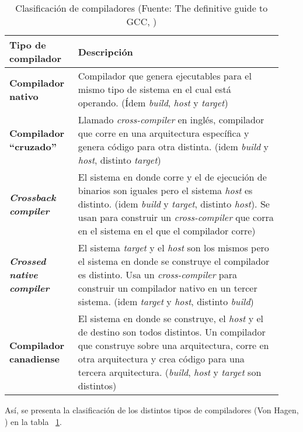     \begin{table}[t]
        \centering
            \caption{Clasificación de compiladores (Fuente: The definitive guide to GCC, \cite{von_hagen_definitive_2006}) }
            \label{tab:TiposCompiladores}
            \begin{tabular}{ | p{0.23\linewidth} | p{0.7\linewidth} | }
                \hline
                \textbf{Tipo de compilador}  & \textbf{Descripción}  \\ \hline
                \textbf{Compilador nativo}  & Compilador que genera  ejecutables para el mismo tipo de sistema en  el cual está operando. (Ídem \emph{build}, \emph{host} y \emph{target})  \\ \hline
                \raggedright \textbf{Compilador “cruzado”}  & Llamado \emph{cross-compiler} en inglés, compilador que corre en una arquitectura específica y genera código para otra distinta. (idem \emph{build} y \emph{host}, distinto \emph{target})   \\ \hline
                \textbf{\emph{Crossback compiler}}    & El sistema en donde corre y el de ejecución de binarios son iguales pero el sistema \emph{host} es distinto. (idem \emph{build} y \emph{target}, distinto \emph{host}).  Se usan para construir un \emph{cross-compiler} que corra en el sistema en el que el compilador corre)  \\ \hline
                \textbf{\emph{Crossed native compiler}}    & El sistema \emph{target} y el \emph{host} son los mismos pero el sistema en donde se construye el compilador es distinto. Usa un \emph{cross-compiler} para construir un compilador nativo en un tercer sistema. (idem \emph{target} y \emph{host}, distinto \emph{build})  \\ \hline
                \raggedright \textbf{Compilador canadiense}    &   El sistema en donde se construye, el \emph{host} y el de destino son todos distintos. Un compilador que construye sobre una arquitectura, corre en otra arquitectura y crea código para una tercera arquitectura. (\emph{build}, \emph{host} y \emph{target} son distintos)   \\ \hline
            \end{tabular}
        \par
    \end{table}

    Así, se presenta la clasificación de los distintos tipos de compiladores (Von Hagen, \cite{von_hagen_definitive_2006}) en la tabla ~\ref{tab:TiposCompiladores}.


